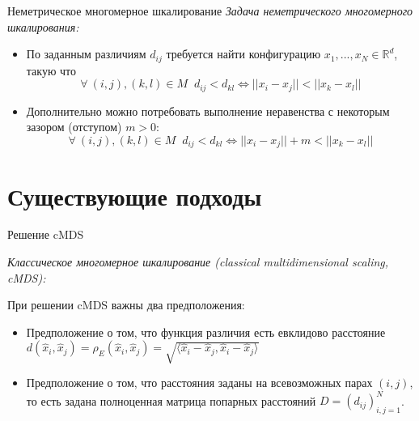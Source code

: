 \documentclass[9pt]{beamer}
\begin{document}
\begin{frame}{Неметрическое многомерное шкалирование}
    \textit{Задача неметрического многомерного шкалирования:}
    
    \begin{itemize}
        \item По заданным различиям $d_{ij}$ требуется найти конфигурацию $x_1, ..., x_N \in \mathbb{R}^d$, такую что
        \begin{equation}
            \forall \: (i, j), (k,l) \in M \; \; d_{ij} < d_{kl} \Longleftrightarrow ||x_i - x_j|| < ||x_k - x_l||
        \end{equation}
        
        \item Дополнительно можно потребовать выполнение неравенства с некоторым зазором (отступом) $m > 0$:
        \begin{equation}
        \label{nmdsproblem}
            \forall \: (i, j), (k,l) \in M \; \; d_{ij} < d_{kl} \Longleftrightarrow ||x_i - x_j|| + m < ||x_k - x_l||
        \end{equation}
    \end{itemize}
\end{frame}

\section{Существующие подходы}

\begin{frame}{Решение cMDS}

\textit{Классическое многомерное шкалирование (classical multidimensional scaling, cMDS):}
    \vspace{\baselineskip}  
    
    При решении cMDS важны два предположения: 
    \begin{itemize}
        \item Предположение о том, что функция различия есть евклидово расстояние $d(\hat{x}_i, \hat{x}_j) = \rho_E(\hat{x}_i, \hat{x}_j) = \sqrt{\langle \hat{x}_i - \hat{x}_j, \hat{x}_i - \hat{x}_j \rangle}$
        \item Предположение о том, что расстояния заданы на всевозможных парах $(i, j)$, то есть задана полноценная матрица попарных расстояний $D = (d_{ij})_{i,j=1}^N$.
    \end{itemize}
    
\end{frame}
\end{document}

